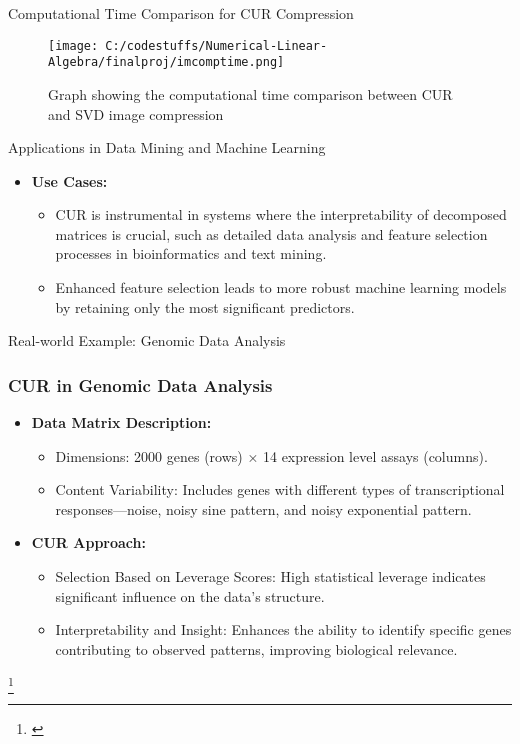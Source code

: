 \documentclass[pdf]{beamer}
\begin{document}
\begin{frame}{Computational Time Comparison for CUR Compression}
    \begin{figure}
        \centering
        \texttt{[image: C:/codestuffs/Numerical-Linear-Algebra/finalproj/imcomptime.png]}
        \caption{Graph showing the computational time comparison between CUR and SVD image compression}
        \label{fig:compression_time}
    \end{figure}
\end{frame}

\begin{frame}{Applications in Data Mining and Machine Learning}
    \begin{itemize}
        \item \textbf{Use Cases:}
            \begin{itemize}
                \item CUR is instrumental in systems where the interpretability of decomposed matrices is crucial, such as detailed data analysis and feature selection processes in bioinformatics and text mining.
                \item Enhanced feature selection leads to more robust machine learning models by retaining only the most significant predictors.
            \end{itemize}
    \end{itemize}
\end{frame}

\begin{frame}{Real-world Example: Genomic Data Analysis}
    \frametitle{CUR in Genomic Data Analysis}
    \begin{itemize}
        \item \textbf{Data Matrix Description:}
        \begin{itemize}
            \item Dimensions: 2000 genes (rows) × 14 expression level assays (columns).
            \item Content Variability: Includes genes with different types of transcriptional responses—noise, noisy sine pattern, and noisy exponential pattern.
        \end{itemize}
        \item \textbf{CUR Approach:}
        \begin{itemize}
            \item Selection Based on Leverage Scores: High statistical leverage indicates significant influence on the data's structure.
            \item Interpretability and Insight: Enhances the ability to identify specific genes contributing to observed patterns, improving biological relevance.
        \end{itemize}
    \end{itemize}
    \footnote{\cite{MahoneyDrineas2009}}
\end{frame}
\end{document}
